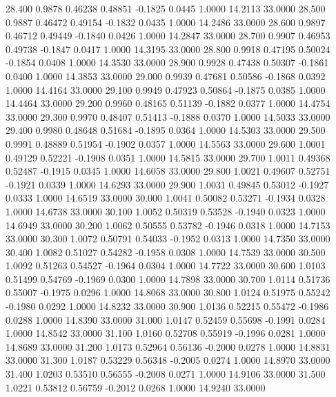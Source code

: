   28.400   0.9878   0.46238   0.48851  -0.1825   0.0445   1.0000  14.2113  33.0000
  28.500   0.9887   0.46472   0.49154  -0.1832   0.0435   1.0000  14.2486  33.0000
  28.600   0.9897   0.46712   0.49449  -0.1840   0.0426   1.0000  14.2847  33.0000
  28.700   0.9907   0.46953   0.49738  -0.1847   0.0417   1.0000  14.3195  33.0000
  28.800   0.9918   0.47195   0.50024  -0.1854   0.0408   1.0000  14.3530  33.0000
  28.900   0.9928   0.47438   0.50307  -0.1861   0.0400   1.0000  14.3853  33.0000
  29.000   0.9939   0.47681   0.50586  -0.1868   0.0392   1.0000  14.4164  33.0000
  29.100   0.9949   0.47923   0.50864  -0.1875   0.0385   1.0000  14.4464  33.0000
  29.200   0.9960   0.48165   0.51139  -0.1882   0.0377   1.0000  14.4754  33.0000
  29.300   0.9970   0.48407   0.51413  -0.1888   0.0370   1.0000  14.5033  33.0000
  29.400   0.9980   0.48648   0.51684  -0.1895   0.0364   1.0000  14.5303  33.0000
  29.500   0.9991   0.48889   0.51954  -0.1902   0.0357   1.0000  14.5563  33.0000
  29.600   1.0001   0.49129   0.52221  -0.1908   0.0351   1.0000  14.5815  33.0000
  29.700   1.0011   0.49368   0.52487  -0.1915   0.0345   1.0000  14.6058  33.0000
  29.800   1.0021   0.49607   0.52751  -0.1921   0.0339   1.0000  14.6293  33.0000
  29.900   1.0031   0.49845   0.53012  -0.1927   0.0333   1.0000  14.6519  33.0000
  30.000   1.0041   0.50082   0.53271  -0.1934   0.0328   1.0000  14.6738  33.0000
  30.100   1.0052   0.50319   0.53528  -0.1940   0.0323   1.0000  14.6949  33.0000
  30.200   1.0062   0.50555   0.53782  -0.1946   0.0318   1.0000  14.7153  33.0000
  30.300   1.0072   0.50791   0.54033  -0.1952   0.0313   1.0000  14.7350  33.0000
  30.400   1.0082   0.51027   0.54282  -0.1958   0.0308   1.0000  14.7539  33.0000
  30.500   1.0092   0.51263   0.54527  -0.1964   0.0304   1.0000  14.7722  33.0000
  30.600   1.0103   0.51499   0.54769  -0.1969   0.0300   1.0000  14.7898  33.0000
  30.700   1.0114   0.51736   0.55007  -0.1975   0.0296   1.0000  14.8068  33.0000
  30.800   1.0124   0.51975   0.55242  -0.1980   0.0292   1.0000  14.8232  33.0000
  30.900   1.0136   0.52215   0.55472  -0.1986   0.0288   1.0000  14.8390  33.0000
  31.000   1.0147   0.52459   0.55698  -0.1991   0.0284   1.0000  14.8542  33.0000
  31.100   1.0160   0.52708   0.55919  -0.1996   0.0281   1.0000  14.8689  33.0000
  31.200   1.0173   0.52964   0.56136  -0.2000   0.0278   1.0000  14.8831  33.0000
  31.300   1.0187   0.53229   0.56348  -0.2005   0.0274   1.0000  14.8970  33.0000
  31.400   1.0203   0.53510   0.56555  -0.2008   0.0271   1.0000  14.9106  33.0000
  31.500   1.0221   0.53812   0.56759  -0.2012   0.0268   1.0000  14.9240  33.0000
